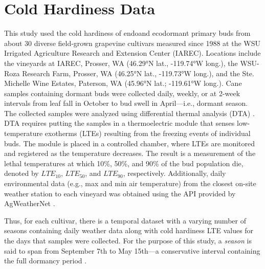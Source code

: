 \section{Cold Hardiness Data}
\label{sec:data}

This study used the cold hardiness of endo\textendash and ecodormant primary buds from about 30 diverse field-grown grapevine cultivars measured since 1988 at the WSU Irrigated Agriculture Research and Extension Center (IAREC). Locations include the vineyards at IAREC, Prosser, WA (46.29°N lat., -119.74°W long.), the WSU-Roza Research Farm, Prosser, WA (46.25°N lat., -119.73°W long.), and the Ste. Michelle Wine Estates, Paterson, WA (45.96°N lat.; -119.61°W long.). Cane samples containing dormant buds were collected daily, weekly, or at 2-week intervals from leaf fall in October to bud swell in April---i.e., dormant season. The collected samples were analyzed using differential thermal analysis (DTA) \cite{mills_cold-hardiness_2006}. DTA requires putting the samples in a thermoelectric module that senses low-temperature exotherms (LTEs) resulting from the freezing events of individual buds. The module is placed in a controlled chamber, where LTEs  are monitored and registered as the temperature decreases. The result is a measurement of the lethal temperatures at which 10\%, 50\%, and 90\% of the bud population die, denoted by $LTE_{10}$, $LTE_{50}$, and $LTE_{90}$, respectively. Additionally, daily environmental data (e.g., max and min air temperature) from the closest on-site weather station to each vineyard was obtained using the API provided by AgWeatherNet \cite{AgWeatherNet}. %

Thus, for each cultivar, there is a temporal dataset with a varying number of seasons containing daily weather data along with cold hardiness LTE values for the days that samples were collected. For the purpose of this study, a \emph{season} is said to span from September 7th to May 15th---a conservative interval containing the full dormancy period \cite{ferguson_dynamic_2011, ferguson_modeling_2014}. 

